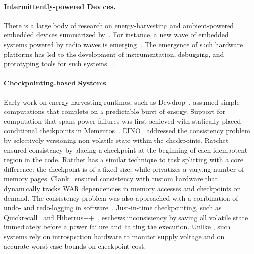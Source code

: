 \paragraph{Intermittently-powered Devices.}
There is a large body of research on energy-harvesting and ambient-powered embedded devices summarized by~\cite{prasad_comst_2014,sample_procieee_2013,huang:commag:2015,visser_procieee_2013,kamalinejad_commag_2015,ku_cst_2016}. For instance, a new wave of embedded systems powered by radio waves is emerging~\cite{patel_pervasive_2017,rf_powered_computing_gollakota_2014,wisp5,moo,zhao_rfid_2015,holleman_biocas_2008,thomas_jbcs_2012,naderiparizi_rfid_2015,rodriguez_tbcs_2015,liu_sigcomm_2013,kicksat,nadeau_naturebio_2017}. The emergence of such hardware platforms
has led to the development of instrumentation, debugging, and prototyping tools for such systems
~\cite{hester_sensys_2014,hester_sensys_2015,edb,capybara,stork,wisent,flicker}.

\paragraph{Checkpointing-based Systems.}
Early work on energy-harvesting runtimes, such as Dewdrop~\cite{dewdrop}, assumed simple computations that complete on a predictable burst of energy.
%
%
Support for computation that spans power failures was first achieved with statically-placed conditional checkpoints in Mementos~\cite{mementos}. 
DINO~\cite{dino} addressed the consistency problem by selectively versioning non-volatile state within the checkpoints. Ratchet~\cite{ratchet} ensured consistency by placing a checkpoint at the beginning of each idempotent region in the code. Ratchet has a similar technique to task splitting with a core difference: the checkpoint is of a fixed size, while \sys privatizes a varying number of memory pages.
%
%
Clank~\cite{hicks_isca_2017} ensured consistency with custom hardware that dynamically tracks WAR dependencies in memory accesses and checkpoints on demand. The consistency problem was also approached with a combination of undo- and redo-logging in software~\cite{baghsorkhi_cgo_2018}. Just-in-time checkpointing, such as Quickrecall~\cite{quickrecall} and Hibernus++~\cite{hibernusplusplus}, eschews inconsistency by saving all volatile state immediately before a power failure and halting the execution. Unlike \sys, such systems rely on introspection hardware to monitor supply voltage and on accurate worst-case bounds on checkpoint cost.

